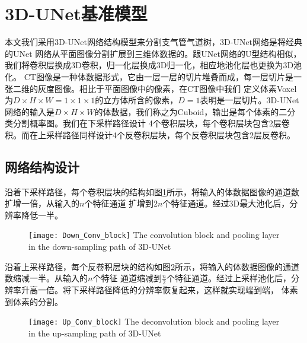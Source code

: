 \section{3D-UNet基准模型}
本文我们采用3D-UNet\cite{cciccek20163d}网络结构模型来分割支气管气道树，3D-UNet网络是将经典的UNet\cite{ronneberger2015u}
网络从平面图像分割扩展到三维体数据的。跟UNet网络的U型结构相似，我们将卷积层换成3D卷积，归一化层换成3D归一化，相应地池化层也更换为3D池化。
CT图像是一种体数据形式，它由一层一层的切片堆叠而成，每一层切片是一张二维的灰度图像。相比于平面图像中的像素，在CT图像中我们
定义体素Voxel为$D \times H \times W = 1 \times 1 \times 1$的立方体所含的像素，$D = 1$表明是一层切片。3D-UNet
网络的输入是$D \times H \times W$的体数据，我们称之为Cuboid，输出是每个体素的二分类分割概率图。我们在下采样路径设计
4个卷积层块，每个卷积层块包含2层卷积。而在上采样路径同样设计4个反卷积层块，每个反卷积层块包含2层反卷积。

\subsection{网络结构设计}

沿着下采样路径，每个卷积层块的结构如图\ref{fig:convblock}所示，将输入的体数据图像的通道数扩增一倍，从输入的$n$个特征通道
扩增到$2n$个特征通道。经过3D最大池化后，分辨率降低一半。
\begin{figure}[h]
    \centering
    \texttt{[image: Down\_Conv\_block]}
        {The convolution block and pooling layer in the down-sampling path of 3D-UNet}
    \label{fig:convblock}
\end{figure}

沿着上采样路径，每个反卷积层块的结构如图\ref{fig:deconvblock}所示，将输入的体数据图像的通道数缩减一半。从输入的$n$个特征
通道缩减到$\frac{n}{2}$个特征通道。经过上采样池化后，分辨率升高一倍。将下采样路径降低的分辨率恢复起来，这样就实现端到端，
体素到体素的分割。
\begin{figure}[h]
    \centering
    \texttt{[image: Up\_Conv\_block]}
        {The deconvolution block and pooling layer in the up-sampling path of 3D-UNet}
    \label{fig:deconvblock}
\end{figure}


